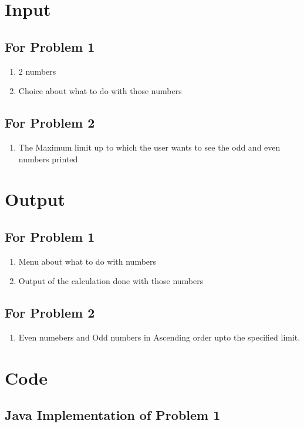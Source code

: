 \documentclass[11pt]{article}
\begin{document}
\section{Input}
\subsection*{For Problem 1}
\begin{enumerate}
	\item 2 numbers
	\item Choice about what to do with those numbers 
\end{enumerate}
\subsection*{For Problem 2}
\begin{enumerate}
	\item The Maximum limit up to which the user wants to see the odd and even numbers printed
\end{enumerate}

\section{Output}
\subsection*{For Problem 1}
\begin{enumerate}
	\item Menu about what to do with numbers
	\item Output of the calculation done with those numbers
\end{enumerate}
\subsection*{For Problem 2}
\begin{enumerate}
	\item Even numebers and Odd numbers in Ascending order upto the specified limit. 
\end{enumerate}


\section{Code}

\subsection{Java Implementation of Problem 1}
\end{document}

